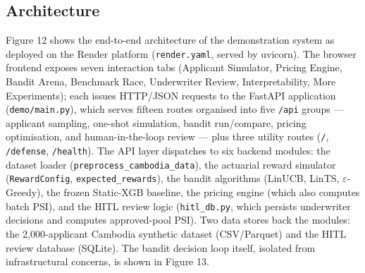 \subsection{Architecture}\label{architecture}

Figure 12 shows the end-to-end architecture of the demonstration system as deployed on the Render platform (\texttt{render.yaml}, served by uvicorn). The browser frontend exposes seven interaction tabs (Applicant Simulator, Pricing Engine, Bandit Arena, Benchmark Race, Underwriter Review, Interpretability, More Experiments); each issues HTTP/JSON requests to the FastAPI application (\texttt{demo/main.py}), which serves fifteen routes organised into five \texttt{/api} groups --- applicant sampling, one-shot simulation, bandit run/compare, pricing optimisation, and human-in-the-loop review --- plus three utility routes (\texttt{/}, \texttt{/defense}, \texttt{/health}). The API layer dispatches to six backend modules: the dataset loader (\texttt{preprocess\_cambodia\_data}), the actuarial reward simulator (\texttt{RewardConfig}, \texttt{expected\_rewards}), the bandit algorithms (LinUCB, LinTS, $\varepsilon$-Greedy), the frozen Static-XGB baseline, the pricing engine (which also computes batch PSI), and the HITL review logic (\texttt{hitl\_db.py}, which persists underwriter decisions and computes approved-pool PSI). Two data stores back the modules: the 2,000-applicant Cambodia synthetic dataset (CSV/Parquet) and the HITL review database (SQLite). The bandit decision loop itself, isolated from infrastructural concerns, is shown in Figure 13.


